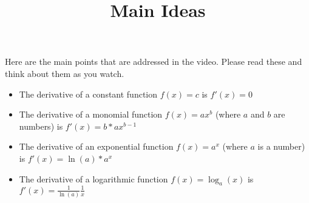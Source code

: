 \documentclass[handout]{ximera}
\title{Main Ideas}
\begin{document}
\begin{abstract}
\end{abstract}

\maketitle

Here are the main points that are addressed in the video. Please read these and think about them as you watch.


\begin{itemize}
\item The derivative of a constant function $f(x)=c$ is $f'(x)=0$
\item The derivative of a monomial function $f(x)=ax^b$ (where $a$ and $b$ are numbers) is $f'(x)=b*ax^{b-1}$
\item The derivative of an exponential function $f(x)=a^x$ (where $a$ is a number) is $f'(x)=\ln(a)*a^x$
\item The derivative of a logarithmic function $f(x)=\log_a(x)$ is $f'(x)=\frac{1}{\ln(a)} \frac{1}{x}$
\end{itemize}
\end{document}
